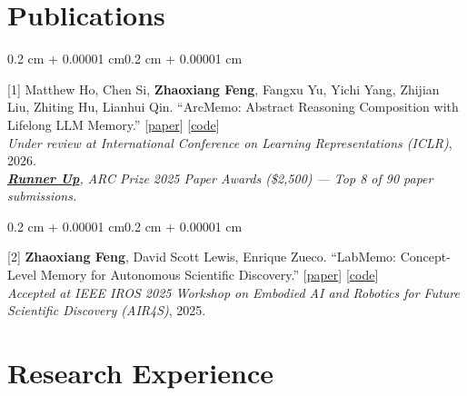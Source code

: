 \documentclass[10pt, letterpaper]{article}
\newenvironment{onecolentry}{
    \begin{adjustwidth}{0.2 cm + 0.00001 cm}{0.2 cm + 0.00001 cm}
}{\end{adjustwidth}}
\begin{document}
    \section{Publications}
    
    \begin{onecolentry}
        {[1]} Matthew Ho, Chen Si, \textbf{Zhaoxiang Feng}, Fangxu Yu, Yichi Yang, Zhijian Liu, Zhiting Hu, Lianhui Qin. ``ArcMemo: Abstract Reasoning Composition with Lifelong LLM Memory.'' \hfill [\href{https://arxiv.org/abs/2509.04439}{paper}] [\href{https://github.com/matt-seb-ho/arc\_memo}{code}]\\
        \textit{Under review at International Conference on Learning Representations (ICLR)}, 2026.\\
        \textit{\href{https://arcprize.org/blog/arc-prize-2025-results-analysis}{\textbf{Runner Up}}, ARC Prize 2025 Paper Awards (\$2,500) --- Top 8 of 90 paper submissions.}
    \end{onecolentry}

    \vspace{0.15 cm}

    \begin{onecolentry}
        {[2]} \textbf{Zhaoxiang Feng}, David Scott Lewis, Enrique Zueco. ``LabMemo: Concept-Level Memory for Autonomous Scientific Discovery.'' \hfill [\href{https://github.com/aaronzhfeng/lab\_memo/blob/main/paper/LabMemo\_Paper.pdf}{paper}] [\href{https://github.com/aaronzhfeng/lab\_memo}{code}]\\
        \textit{Accepted at IEEE IROS 2025 Workshop on Embodied AI and Robotics for Future Scientific Discovery (AIR4S)}, 2025.
    \end{onecolentry}

    \section{Research Experience}
\end{document}
